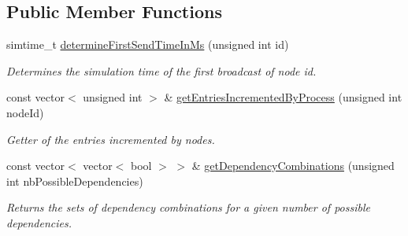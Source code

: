\subsection*{Public Member Functions}
\begin{DoxyCompactItemize}
\item 
simtime\+\_\+t \hyperlink{class_simulation_parameters_acf83b84e172a799e1db3bf9554c4787f}{determine\+First\+Send\+Time\+In\+Ms} (unsigned int id)
\begin{DoxyCompactList}\small\item\em Determines the simulation time of the first broadcast of node id. \end{DoxyCompactList}\item 
const vector$<$ unsigned int $>$ \& \hyperlink{class_simulation_parameters_aa8a52acbc3c5d374decafb59dcf0e971}{get\+Entries\+Incremented\+By\+Process} (unsigned int node\+Id)
\begin{DoxyCompactList}\small\item\em Getter of the entries incremented by nodes. \end{DoxyCompactList}\item 
const vector$<$ vector$<$ bool $>$ $>$ \& \hyperlink{class_simulation_parameters_a39008b8c9ed5c7c27dbfe7c5355d8062}{get\+Dependency\+Combinations} (unsigned int nb\+Possible\+Dependencies)
\begin{DoxyCompactList}\small\item\em Returns the sets of dependency combinations for a given number of possible dependencies. \end{DoxyCompactList}\end{DoxyCompactItemize}
